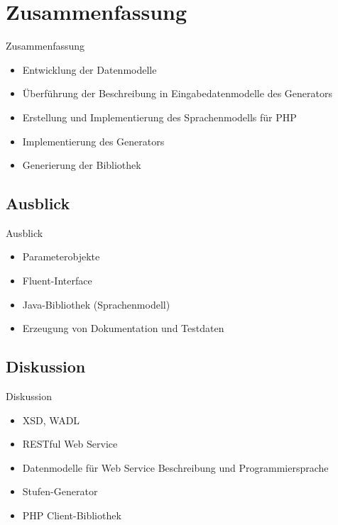 \section{Zusammenfassung}

\begin{frame}{Zusammenfassung}
    \begin{itemize}
        \item Entwicklung der Datenmodelle
        \item Überführung der Beschreibung in Eingabedatenmodelle des Generators
        \item Erstellung und Implementierung des Sprachenmodells für PHP
        \item Implementierung des Generators
        \item Generierung der Bibliothek
    \end{itemize}
\end{frame}

\subsection{Ausblick}
\begin{frame}{Ausblick}
    \begin{itemize}
        \item Parameterobjekte
        \item {\color{gray} Fluent-Interface}
        \item Java-Bibliothek (Sprachenmodell)
        \item Erzeugung von Dokumentation und Testdaten
    \end{itemize}
\end{frame}

\subsection{Diskussion}
\begin{frame}{Diskussion}
    \begin{itemize}
        \item XSD, WADL
        \item RESTful Web Service
        \item Datenmodelle für Web Service Beschreibung und Programmiersprache
        \item Stufen-Generator
        \item PHP Client-Bibliothek
    \end{itemize}
\end{frame}
